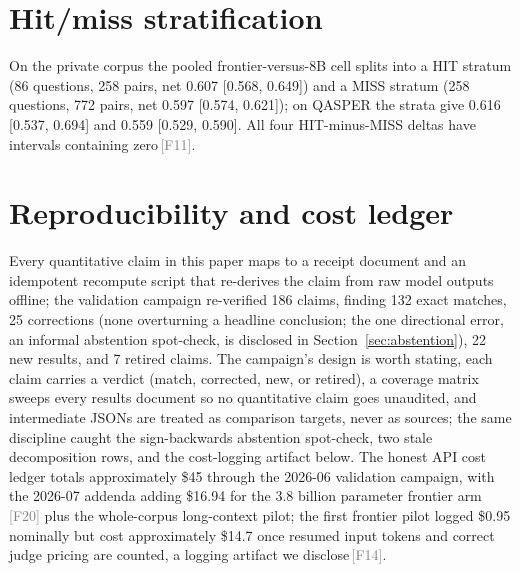 \documentclass[11pt]{article}
\newcommand{\rcpt}[1]{\textcolor{gray}{\,\textsf{\scriptsize[#1]}}}
\begin{document}
\section{Hit/miss stratification}
\label{app:hitmiss}
On the private corpus the pooled frontier-versus-8B cell splits into a HIT stratum (86 questions, 258 pairs, net 0.607 [0.568, 0.649]) and a MISS stratum (258 questions, 772 pairs, net 0.597 [0.574, 0.621]); on QASPER the strata give 0.616 [0.537, 0.694] and 0.559 [0.529, 0.590]. All four HIT-minus-MISS deltas have intervals containing zero\rcpt{F11}.

\section{Reproducibility and cost ledger}
\label{app:repro}
Every quantitative claim in this paper maps to a receipt document and an idempotent recompute script that re-derives the claim from raw model outputs offline; the validation campaign re-verified 186 claims, finding 132 exact matches, 25 corrections (none overturning a headline conclusion; the one directional error, an informal abstention spot-check, is disclosed in Section~\ref{sec:abstention}), 22 new results, and 7 retired claims. The campaign's design is worth stating, each claim carries a verdict (match, corrected, new, or retired), a coverage matrix sweeps every results document so no quantitative claim goes unaudited, and intermediate JSONs are treated as comparison targets, never as sources; the same discipline caught the sign-backwards abstention spot-check, two stale decomposition rows, and the cost-logging artifact below. The honest API cost ledger totals approximately \$45 through the 2026-06 validation campaign, with the 2026-07 addenda adding \$16.94 for the 3.8 billion parameter frontier arm\rcpt{F20} plus the whole-corpus long-context pilot; the first frontier pilot logged \$0.95 nominally but cost approximately \$14.7 once resumed input tokens and correct judge pricing are counted, a logging artifact we disclose\rcpt{F14}.
\end{document}
